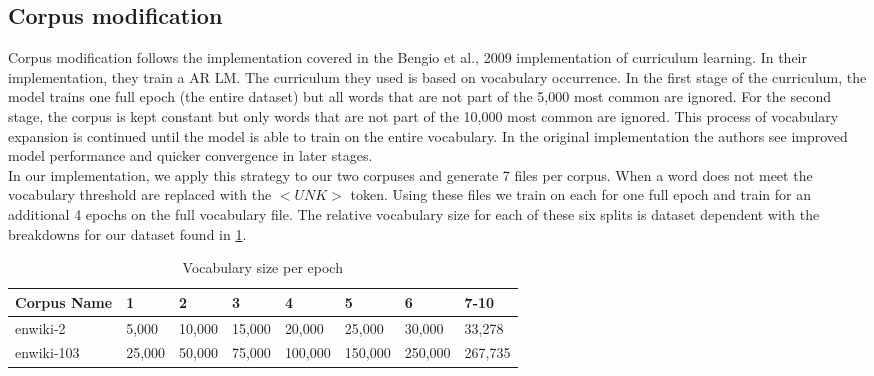 \subsection{Corpus modification}
Corpus modification follows the implementation covered in the Bengio et al., 2009 \cite{Bengio2009CurriculumL} implementation of curriculum learning. In their implementation, they train a AR LM. The curriculum they used is based on vocabulary occurrence. In the first stage of the curriculum, the model trains one full epoch (the entire dataset) but all words that are not part of the 5,000 most common are ignored. For the second stage, the corpus is kept constant but only words that are not part of the 10,000 most common are ignored. This process of vocabulary expansion is continued until the model is able to train on the entire vocabulary. In the original implementation the authors see improved model performance and quicker convergence in later stages. \\
In our implementation, we apply this strategy to our two corpuses and generate 7 files per corpus. When a word does not meet the vocabulary threshold are replaced with the $<UNK>$ token. Using these files we train on each for one full epoch and train for an additional 4 epochs on the full vocabulary file. The relative vocabulary size for each of these six splits is dataset dependent with the breakdowns for our dataset found in \ref{table:2}.
\begin{table}[h!]
\begin{center}
\begin{tabular}{|l|l|l|l|l|l|l|l|} \hline
\textbf{Corpus Name} & \textbf{1} & \textbf{2} & \textbf{3} & \textbf{4} & \textbf{5} & \textbf{6} & \textbf{7-10}  \\ \hline
enwiki-2 & 5,000 & 10,000 & 15,000 & 20,000 & 25,000 & 30,000 & 33,278 \\ \hline
enwiki-103 & 25,000 & 50,000 & 75,000 & 100,000 & 150,000  & 250,000 & 267,735\\ \hline
\end{tabular}
\caption{Vocabulary size per epoch}
\label{table:2}
\end{center}
\end{table}
